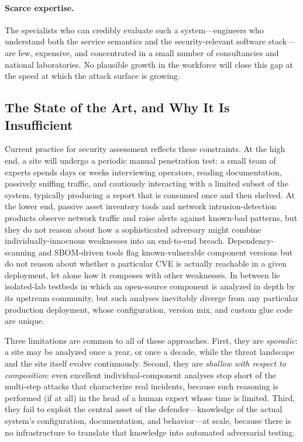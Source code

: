\paragraph{Scarce expertise.}
The specialists who can credibly evaluate such a system---engineers who
understand both the service semantics and the security-relevant software
stack---are few, expensive, and concentrated in a small number of
consultancies and national laboratories. No plausible growth in the
workforce will close this gap at the speed at which the attack surface
is growing.

\subsection{The State of the Art, and Why It Is Insufficient}
\label{sec:intro-sota}

Current practice for \cps security assessment reflects these
constraints. At the high end, a site will undergo a periodic manual
penetration test: a small team of experts spends days or weeks
interviewing operators, reading documentation, passively sniffing
traffic, and cautiously interacting with a limited subset of the system,
typically producing a report that is consumed once and then shelved. At
the lower end, passive asset inventory tools and network intrusion-detection
products observe network traffic and raise alerts against known-bad
patterns, but they do not reason about how a sophisticated adversary
might combine individually-innocuous weaknesses into an end-to-end
breach. Dependency-scanning and SBOM-driven tools flag known-vulnerable
component versions but do not reason about whether a particular CVE
is actually reachable in a given deployment, let alone how it composes
with other weaknesses. In between lie isolated-lab testbeds in which
an open-source component is analyzed in depth by its upstream community,
but such analyses inevitably diverge from any particular production
deployment, whose configuration, version mix, and custom glue code
are unique.

Three limitations are common to all of these approaches. First, they
are \emph{sporadic}: a site may be analyzed once a year, or once a
decade, while the threat landscape and the site itself evolve
continuously. Second, they are \emph{shallow with respect to
composition}: even excellent individual-component analyses stop short
of the multi-step attacks that characterize real incidents, because
such reasoning is performed (if at all) in the head of a human expert
whose time is limited. Third, they fail to exploit the central asset
of the defender---knowledge of the actual system's configuration,
documentation, and behavior---at scale, because there is no
infrastructure to translate that knowledge into automated adversarial
testing.

